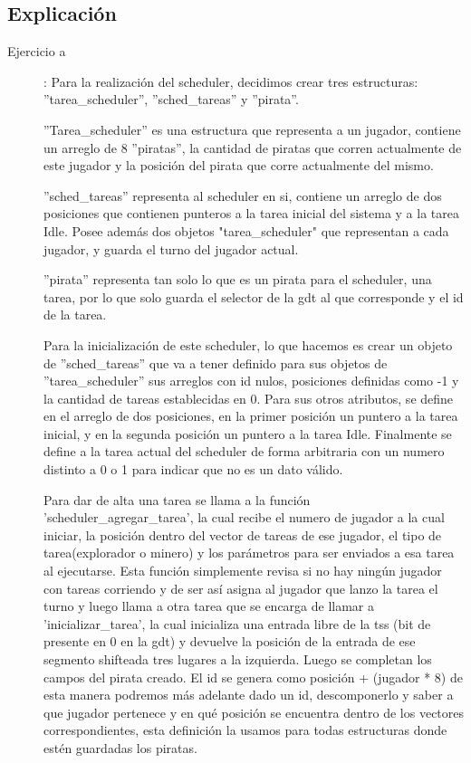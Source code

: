 \documentclass[a4paper]{article}
\begin{document}
\subsection{Explicación}


\begin{description}

  \item[Ejercicio a] :\newline 
  Para la realización del scheduler, decidimos crear tres estructuras: ''tarea_scheduler'', ''sched_tareas'' y ''pirata''. 
  
  ''Tarea_scheduler'' es una estructura que representa a un jugador, contiene un arreglo de 8 ''piratas'', la cantidad de piratas que corren actualmente de este jugador y la posición del pirata que corre actualmente del mismo.
  
  ''sched_tareas'' representa al scheduler en si, contiene un arreglo de dos posiciones que contienen punteros a la tarea inicial del sistema y a la tarea Idle. Posee además dos objetos "tarea_scheduler" que representan a cada jugador, y guarda el turno del jugador actual. 
  
  ''pirata'' representa tan solo lo que es un pirata para el scheduler, una tarea, por lo que solo guarda el selector de la gdt al que corresponde y el id de la tarea.
  

Para la inicialización de este scheduler, lo que hacemos es crear un objeto de ''sched_tareas'' que va a tener definido para sus objetos de ''tarea_scheduler'' sus arreglos con id nulos, posiciones definidas como -1 y la cantidad de tareas establecidas en 0. Para sus otros atributos, se define en el arreglo de dos posiciones, en la primer posición un puntero a la tarea inicial, y en la segunda posición un puntero a la tarea Idle. Finalmente se define a la tarea actual del scheduler de forma arbitraria con un numero distinto a 0 o 1 para indicar que no es un dato válido.
  
Para dar de alta una tarea se llama a la función 'scheduler_agregar_tarea', la cual recibe el numero de jugador a la cual iniciar, la posición dentro del vector de tareas de ese jugador, el tipo de tarea(explorador o minero) y los parámetros para ser enviados a esa tarea al ejecutarse. Esta función simplemente revisa si no hay ningún jugador con tareas corriendo y de ser así asigna al jugador que lanzo la tarea el turno y luego llama a otra tarea que se encarga de llamar a 'inicializar_tarea', la cual inicializa una entrada libre de la tss (bit de presente en 0 en la gdt) y devuelve la posición de la entrada de ese segmento shifteada tres lugares a la izquierda. Luego se completan los campos del pirata creado. El id se genera como posición + (jugador * 8) de esta manera podremos más adelante dado un id, descomponerlo y saber a que jugador pertenece y en qué posición se encuentra dentro de los vectores correspondientes, esta definición la usamos para todas estructuras donde estén guardadas los piratas.


\end{description}
\end{document}
